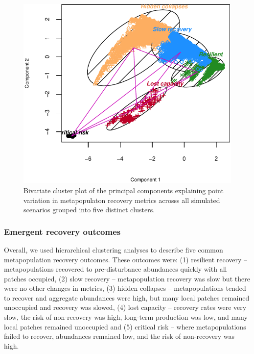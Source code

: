 \documentclass[
]{article}
\begin{document}
\begin{figure}[H]

{\centering \includegraphics{Managing_for_ecological_surprises_in_metapopulations_files/figure-latex/clustering plot-1} 

}

\caption{Bivariate cluster plot of the principal components explaining point variation in metapopulaton recovery metrics acrosss all simulated scenarios grouped into five distinct clusters.}\label{fig:clustering plot}
\end{figure}

\hypertarget{emergent-recovery-outcomes}{%
\subsubsection{Emergent recovery
outcomes}\label{emergent-recovery-outcomes}}

Overall, we used hierarchical clustering analyses to describe five
common metapopulation recovery outcomes. These outcomes were: (1)
resilient recovery -- metapopulations recovered to pre-disturbance
abundances quickly with all patches occupied, (2) slow recovery --
metapopulation recovery was slow but there were no other changes in
metrics, (3) hidden collapses -- metapopulations tended to recover and
aggregate abundances were high, but many local patches remained
unoccupied and recovery was slowed, (4) lost capacity -- recovery rates
were very slow, the risk of non-recovery was high, long-term production
was low, and many local patches remained unoccupied and (5) critical
risk -- where metapopulations failed to recover, abundances remained
low, and the risk of non-recovery was high.
\end{document}
